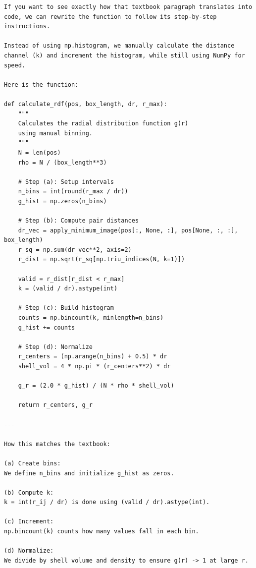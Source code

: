 \begin{lstlisting}
If you want to see exactly how that textbook paragraph translates into code, we can rewrite the function to follow its step-by-step instructions.

Instead of using np.histogram, we manually calculate the distance channel (k) and increment the histogram, while still using NumPy for speed.

Here is the function:

def calculate_rdf(pos, box_length, dr, r_max):
    """
    Calculates the radial distribution function g(r)
    using manual binning.
    """
    N = len(pos)
    rho = N / (box_length**3)
    
    # Step (a): Setup intervals
    n_bins = int(round(r_max / dr))
    g_hist = np.zeros(n_bins)
    
    # Step (b): Compute pair distances
    dr_vec = apply_minimum_image(pos[:, None, :], pos[None, :, :], box_length)
    r_sq = np.sum(dr_vec**2, axis=2)
    r_dist = np.sqrt(r_sq[np.triu_indices(N, k=1)])
    
    valid = r_dist[r_dist < r_max]
    k = (valid / dr).astype(int)
    
    # Step (c): Build histogram
    counts = np.bincount(k, minlength=n_bins)
    g_hist += counts
    
    # Step (d): Normalize
    r_centers = (np.arange(n_bins) + 0.5) * dr
    shell_vol = 4 * np.pi * (r_centers**2) * dr
    
    g_r = (2.0 * g_hist) / (N * rho * shell_vol)
    
    return r_centers, g_r

---

How this matches the textbook:

(a) Create bins:
We define n_bins and initialize g_hist as zeros.

(b) Compute k:
k = int(r_ij / dr) is done using (valid / dr).astype(int).

(c) Increment:
np.bincount(k) counts how many values fall in each bin.

(d) Normalize:
We divide by shell volume and density to ensure g(r) -> 1 at large r.
\end{lstlisting}


